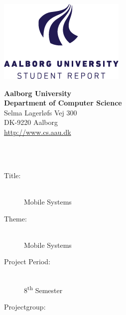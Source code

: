 \begin{titlepage}
    \setlength{\textwidth}{15cm}
    \noindent
    \begin{nopagebreak}
        \begin{minipage}{0.4\textwidth}
            \centering
            \includegraphics[width=\textwidth]{img/aau-logo-english.png}
        \end{minipage} \hfill
        \begin{minipage}{0.4\textwidth}
            \flushright
            \textbf{Aalborg University}\\
            \textbf{Department of Computer Science}\\
            Selma Lagerløfs Vej 300\\
            DK-9220 Aalborg\\
            \url{http://www.cs.aau.dk}
        \end{minipage}\\
        \vspace{1cm}\\
        \begin{minipage}[t]{0.4\textwidth}
            \begin{description}
                \item[Title:] \hfill\\
                    Mobile Systems
                \item[Theme:] \hfill\\
                    Mobile Systems
                \item[Project Period:] \hfill\\
                    8\textsuperscript{th} Semester
                \item[Projectgroup:] \hfill\\

\end{description}
\end{minipage}
\end{nopagebreak}
\end{titlepage}
